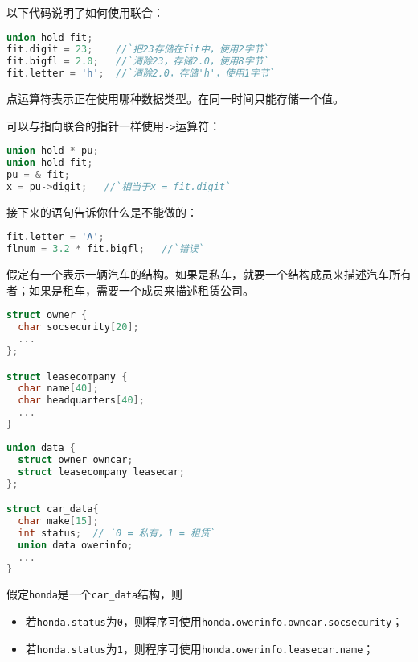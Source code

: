\begin{frame}[fragile]\ft{\secname}
以下代码说明了如何使用联合：
\begin{lstlisting}[language=c,backgroundcolor=\color{red!20}]
union hold fit;
fit.digit = 23;    //`把23存储在fit中，使用2字节`
fit.bigfl = 2.0;   //`清除23，存储2.0，使用8字节`
fit.letter = 'h';  //`清除2.0，存储'h'，使用1字节` 
\end{lstlisting}
点运算符表示正在使用哪种数据类型。在同一时间只能存储一个值。
\end{frame}

\begin{frame}[fragile]\ft{\secname}
可以与指向联合的指针一样使用\verb|->|运算符：
\begin{lstlisting}[language=c,backgroundcolor=\color{red!20}]
union hold * pu;
union hold fit;
pu = & fit;
x = pu->digit;   //`相当于x = fit.digit`
\end{lstlisting}
接下来的语句告诉你什么是不能做的：
\begin{lstlisting}[language=c,backgroundcolor=\color{red!20}]
fit.letter = 'A';
flnum = 3.2 * fit.bigfl;   //`错误`
\end{lstlisting}
\end{frame}

\begin{frame}[fragile]
假定有一个表示一辆汽车的结构。如果是私车，就要一个结构成员来描述汽车所有者；如果是租车，需要一个成员来描述租赁公司。
\begin{lstlisting}[language=c,backgroundcolor=\color{red!20}]
struct owner {
  char socsecurity[20];
  ...
};

struct leasecompany {
  char name[40];
  char headquarters[40];
  ...
}
\end{lstlisting}
\end{frame}

\begin{frame}[fragile]
\begin{lstlisting}[language=c,backgroundcolor=\color{red!20}]
union data {
  struct owner owncar;
  struct leasecompany leasecar;
};

struct car_data{
  char make[15];
  int status;  // `0 = 私有，1 = 租赁` 
  union data owerinfo;
  ...
}
\end{lstlisting}

\end{frame}

\begin{frame}[fragile]
假定\verb|honda|是一个\verb|car_data|结构，则
\begin{itemize}
\item 若\verb|honda.status|为\verb|0|，则程序可使用\verb|honda.owerinfo.owncar.socsecurity|；\\[0.1in]
\item 若\verb|honda.status|为\verb|1|，则程序可使用\verb|honda.owerinfo.leasecar.name|；\\[0.1in]
\end{itemize}
\end{frame}

